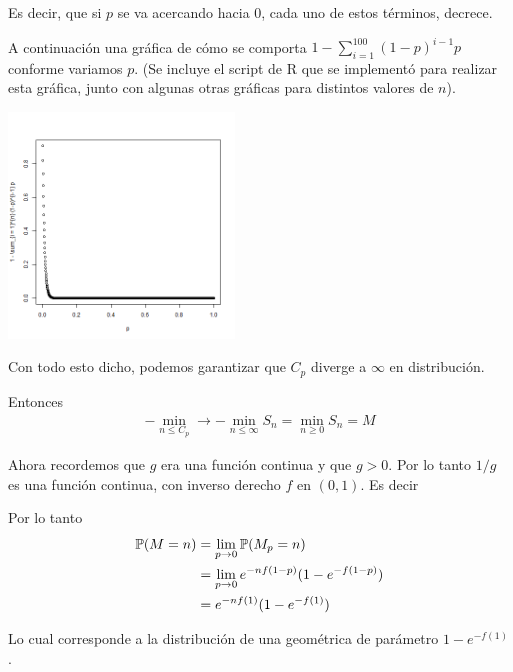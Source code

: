 Es decir, que si $p$ se va acercando hacia 0, cada uno de estos términos, decrece.\par\null

A continuación una gráfica de cómo se comporta $1 - \sum_{i = 1}^{100} (1-p)^{i-1}p$ conforme variamos $p$.
(Se incluye el script de R que se implementó para realizar esta gráfica, junto con algunas otras gráficas para
distintos valores de $n$).\par\null

\begin{center}
    \includegraphics[width=6cm]{tarea2/problema2_1/graficas_inciso2_1_4/probabilidadDeQueC_pSupere100.png}
\end{center}\par\null

Con todo esto dicho, podemos garantizar que $C_p$ diverge a $\infty$ en distribución.\par\null

Entonces 
\begin{align}
    - \min_{n \leq C_p} \rightarrow - \min_{n \leq \infty} S_n = \min_{n \geq 0} S_n = M
\end{align}\par\null

Ahora recordemos que $g$ era una función continua y que $g>0$. Por lo tanto $1/g$ es una función continua,
con inverso derecho $f$ en $(0, 1)$. Es decir

Por lo tanto
\begin{align}
    \mathbb{P}(M = n)  &=  \lim_{p \rightarrow 0} \mathbb{P}(M_p = n)                         \\
                &=  \lim_{p \rightarrow 0} e^{-n f(1-p)}(1-e^{- f(1-p)})        \\
                &=   e^{-n f(1)}(1-e^{- f(1)}) \label{problema2_1:distribucion_de_M}
\end{align}

Lo cual corresponde a la distribución de una geométrica de parámetro $1-e^{- f(1)}$.\par\null

